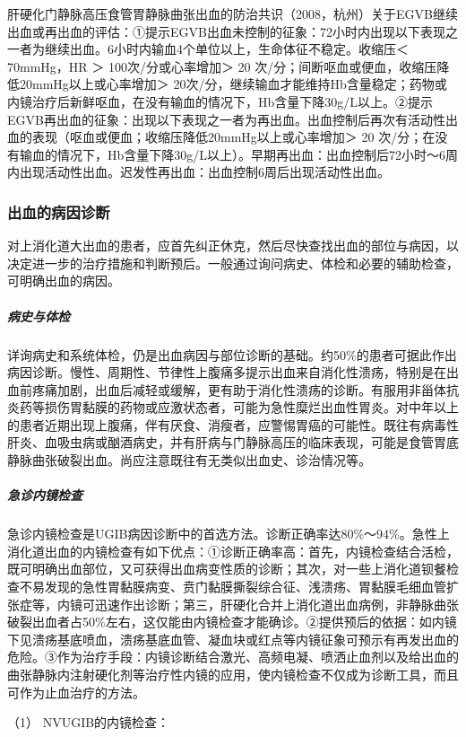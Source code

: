 肝硬化门静脉高压食管胃静脉曲张出血的防治共识（2008，杭州）关于EGVB继续出血或再出血的评估：①提示EGVB出血未控制的征象：72小时内出现以下表现之一者为继续出血。6小时内输血4个单位以上，生命体征不稳定。收缩压＜
70mmHg，HR ＞ 100次/分或心率增加＞ 20
次/分；间断呕血或便血，收缩压降低20mmHg以上或心率增加＞
20次/分，继续输血才能维持Hb含量稳定；药物或内镜治疗后新鲜呕血，在没有输血的情况下，Hb含量下降30g/L以上。②提示EGVB再出血的征象：出现以下表现之一者为再出血。出血控制后再次有活动性出血的表现（呕血或便血；收缩压降低20mmHg以上或心率增加＞
20
次/分；在没有输血的情况下，Hb含量下降30g/L以上）。早期再出血：出血控制后72小时～6周内出现活动性出血。迟发性再出血：出血控制6周后出现活动性出血。

\subsubsection{出血的病因诊断}

对上消化道大出血的患者，应首先纠正休克，然后尽快查找出血的部位与病因，以决定进一步的治疗措施和判断预后。一般通过询问病史、体检和必要的辅助检查，可明确出血的病因。

\subparagraph{病史与体检}

详询病史和系统体检，仍是出血病因与部位诊断的基础。约50\%的患者可据此作出病因诊断。慢性、周期性、节律性上腹痛多提示出血来自消化性溃疡，特别是在出血前疼痛加剧，出血后减轻或缓解，更有助于消化性溃疡的诊断。有服用非甾体抗炎药等损伤胃黏膜的药物或应激状态者，可能为急性糜烂出血性胃炎。对中年以上的患者近期出现上腹痛，伴有厌食、消瘦者，应警惕胃癌的可能性。既往有病毒性肝炎、血吸虫病或酗酒病史，并有肝病与门静脉高压的临床表现，可能是食管胃底静脉曲张破裂出血。尚应注意既往有无类似出血史、诊治情况等。

\subparagraph{急诊内镜检查}

急诊内镜检查是UGIB病因诊断中的首选方法。诊断正确率达80\%～94\%。急性上消化道出血的内镜检查有如下优点：①诊断正确率高：首先，内镜检查结合活检，既可明确出血部位，又可获得出血病变性质的诊断；其次，对一些上消化道钡餐检查不易发现的急性胃黏膜病变、贲门黏膜撕裂综合征、浅溃疡、胃黏膜毛细血管扩张症等，内镜可迅速作出诊断；第三，肝硬化合并上消化道出血病例，非静脉曲张破裂出血者占50\%左右，这仅能由内镜检查才能确诊。②提供预后的依据：如内镜下见溃疡基底喷血，溃疡基底血管、凝血块或红点等内镜征象可预示有再发出血的危险。③作为治疗手段：内镜诊断结合激光、高频电凝、喷洒止血剂以及给出血的曲张静脉内注射硬化剂等治疗性内镜的应用，使内镜检查不仅成为诊断工具，而且可作为止血治疗的方法。

\hypertarget{text00032.htmlux5cux23CHP1-13-1-4-4-2-1}{}
（1） NVUGIB的内镜检查：

